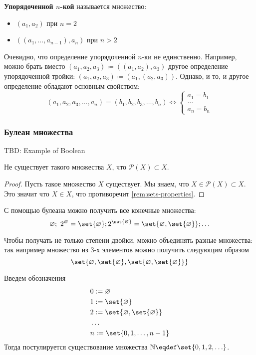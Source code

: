 \documentclass{article}
\newcommand{\powerset}{\mathcal{P}}
\begin{document}
    \begin{definition}
        \label{def:ordered-cortege}
        \textbf{Упорядоченной \(n\)-кой} называется множество:
        \begin{itemize}
            \item  \((a_1, a_2)\) при \(n=2\)
            \item \(((a_1, \ldots, a_{n-1}), a_n)\) при \(n > 2\)
        \end{itemize}
    \end{definition}
    \begin{remark}
        \label{rem:ordered-pair-universal-property}
        Очевидно, что определение упорядоченной \(n\)-ки не единственно. Например, можно брать вместо \((a_1, a_2, a_3) \coloneq ((a_1, a_2), a_3)\) другое определение упорядоченной тройки: \((a_1, a_2, a_3) \coloneq (a_1, (a_2, a_3))\). Однако, и то, и другое определение обладают основным свойством:
        \[(a_1, a_2, a_3, \ldots, a_n) = (b_1, b_2, b_3, \ldots, b_n) \Leftrightarrow \begin{cases} a_1 = b_1 \\ \ldots\\ a_n = b_n\end{cases}\]
    \end{remark}

\subsubsection{Булеан множества}

    TBD: Example of Boolean

    \begin{proposition}
        \label{prop:powerset-notsubset-set}
        Не существует такого множества \(X\), что \(\powerset(X) \subset X\).
    \end{proposition}
    \begin{proof}
        Пусть такое множество \(X\) существует.
        Мы знаем, что \(X \in \powerset(X) \subset X\). Это значит что \(X \in X\), что противоречит \ref{rem:sets-properties}.
    \end{proof}

    С помощью булеана можно получить все конечные множества:
    \[\varnothing;\ 2^\varnothing = \set{\varnothing}; 2^{\set{\varnothing}} = \set{\varnothing, \set{\varnothing}}; \ldots\]
    \begin{remark}
        Чтобы получать не только степени двойки, можно объединять разные множества: так например множество из 3-х элементов можно получить следующим образом 
        \[\set{\varnothing, \set{\varnothing}, \set{\varnothing, \set{\varnothing}}}\] 
    \end{remark}
    Введем обозначения
    \begin{align}
        &0 := \varnothing \\
        &1 := \set{\varnothing}\\
        &2 := \set{\varnothing, \set{\varnothing}} \\
        &\dots \\
        &n := \set{0, 1, \ldots, n - 1}
    \end{align}
    Тогда постулируется существование множества \(\mathbb N \eqdef \set{0, 1, 2, \ldots}\). 
\end{document}
